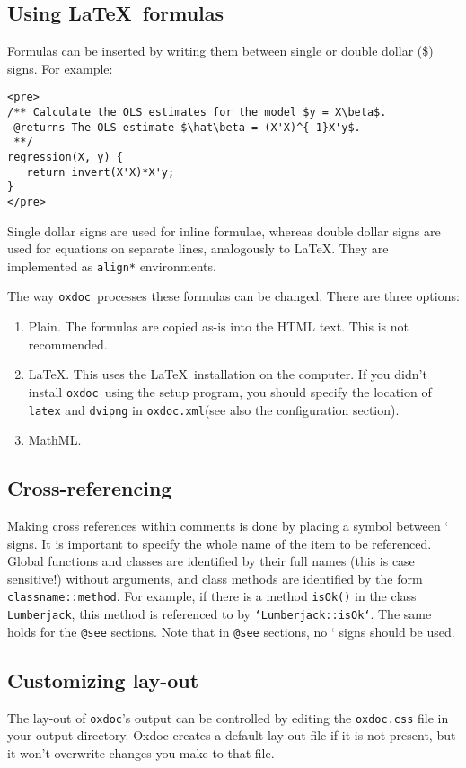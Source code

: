 \documentclass[11pt]{article}
\newcommand\oxdoc{{\tt oxdoc}}
\newcommand\oxdocxml{{\tt oxdoc.xml}}
\begin{document}
\subsection{Using \LaTeX~formulas}
Formulas can be inserted by writing them between single or double dollar (\$) signs. 
For example:
\begin{lstlisting}
<pre>
/** Calculate the OLS estimates for the model $y = X\beta$.
 @returns The OLS estimate $\hat\beta = (X'X)^{-1}X'y$.
 **/
regression(X, y) {
   return invert(X'X)*X'y;
}
</pre>
\end{lstlisting}

Single dollar signs are used for inline formulae, whereas double dollar signs
are used for equations on separate lines, analogously to \LaTeX.  They 
are implemented as {\tt align*} environments.

The way \oxdoc~processes these formulas can be changed.  There are three options:
\begin{enumerate}
\item Plain.  The formulas are copied as-is into the HTML text.  This is not
recommended.

\item \LaTeX.  This uses the \LaTeX~installation on the computer. If you
didn't install \oxdoc~using the setup program, you should specify the
location of {\tt latex} and {\tt dvipng} in \oxdocxml (see also the configuration
section).


\item MathML.  
\end{enumerate}

\subsection{Cross-referencing}
Making cross references within comments is done by placing a symbol between ` signs.  It is important to
specify the whole name of the item to be referenced.  Global functions and classes are identified by
their full names (this is case sensitive!) without arguments, and class methods are identified by the
form {\tt classname::method}. For example, if there is a method {\tt isOk()} in the class {\tt Lumberjack},
this method is referenced to by {\tt `Lumberjack::isOk`}.  The same holds for the {\tt @see} sections.
Note that in {\tt @see} sections, no ` signs should be used.


\subsection{Customizing lay-out}
The lay-out of \oxdoc's output can be controlled by editing the
{\tt oxdoc.css} file in your output directory. Oxdoc creates a default
lay-out file if it is not present, but it won't overwrite changes you make
to that file. 
\end{document}
